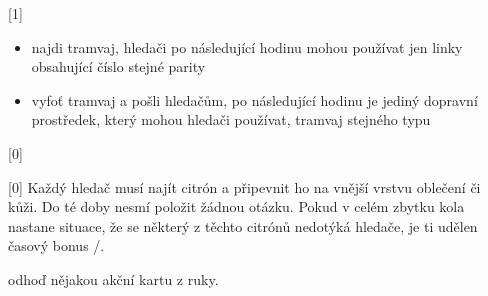 \begin{cards}
	\begin{itemize}
		\item najdi tramvaj, hledači po následující hodinu mohou používat jen linky obsahující číslo stejné parity
		\item vyfoť tramvaj a pošli hledačům, po následující hodinu je jediný dopravní prostředek, který mohou hledači používat, tramvaj stejného typu
	\end{itemize}


	 Každý hledač musí najít citrón a připevnit ho na vnější vrstvu oblečení či kůži. Do té doby nesmí položit žádnou otázku. Pokud v celém zbytku kola nastane situace, že se některý z těchto citrónů nedotýká hledače, je ti udělen časový bonus \timecurselemonpenalty/.

	\cost odhoď nějakou akční kartu z ruky.
\end{cards}
